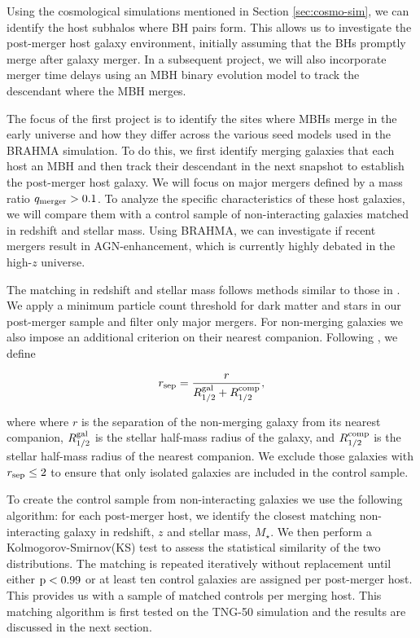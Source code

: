 \documentclass[11pt, letterpaper]{article}
\begin{document}
Using the cosmological simulations mentioned in Section \ref{sec:cosmo-sim}, we can identify the host subhalos where BH pairs form. This allows us to investigate the post-merger host galaxy environment, initially assuming that the BHs promptly merge after galaxy merger. In a subsequent project, we will also incorporate merger time delays using an MBH binary evolution model to track the descendant where the MBH merges.

The focus of the first project is to identify the sites where MBHs merge in the early universe and how they differ across the various seed models used in the BRAHMA simulation. To do this, we first identify merging galaxies that each host an MBH and then track their descendant in the next snapshot to establish the post-merger host galaxy. We will focus on major mergers defined by a mass ratio $q_{\rm merger} > 0.1$. To analyze the specific characteristics of these host galaxies, we will compare them with a control sample of non-interacting galaxies matched in redshift and stellar mass. Using BRAHMA, we can investigate if recent mergers result in AGN-enhancement, which is currently highly debated in the high-$z$ universe.

The matching in redshift and stellar mass follows methods similar to those in \citet{Ellison_2025, Hani_2020, Patton_2020}. We apply a minimum particle count threshold for dark matter and stars in our post-merger sample and filter only major mergers. For non-merging galaxies we also impose an additional criterion on their nearest companion. Following \citet{Patton_2020}, we define

\begin{equation} r_{\rm sep} = \frac{r}{R^{\rm gal}_{1/2} + R^{\rm comp}_{1/2}}, \end{equation}


where where $r$ is the separation of the non-merging galaxy from its
nearest companion, $R^{\rm gal}_{1/2}$ is the stellar half-mass
radius of the galaxy, and $R^{\rm comp}_{1/2}$ is the stellar
half-mass radius of the nearest companion. We exclude those galaxies with $r_{\rm sep} \leq 2$ to ensure that only isolated galaxies are included in the control sample.

To create the control sample from non-interacting galaxies we use the following 
algorithm: for each post-merger host, we identify the closest matching non-interacting galaxy in redshift, $z$ and stellar mass, $M_{\star}$. We then perform a Kolmogorov-Smirnov(KS) test to assess the statistical similarity of the two distributions. The matching is repeated iteratively without replacement until either $\rm p < 0.99$ or at least ten control galaxies are assigned per post-merger host. This provides us with a sample of matched controls per merging host. This matching algorithm is first tested on the TNG-50 simulation and the results are discussed in the next section. 
\end{document}

